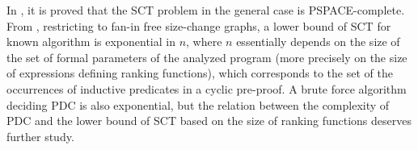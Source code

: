 In \cite{Lee1}, it is proved that the SCT problem in the general case is PSPACE-complete. 
From  \cite{Lee3}, restricting to fan-in free size-change graphs, a lower bound of SCT
for known algorithm is exponential in $n$, where $n$ essentially depends on the size of the set of formal parameters of the analyzed program (more precisely on the size of expressions defining ranking functions), which corresponds to the set of the occurrences of inductive predicates in a cyclic pre-proof. A brute force algorithm deciding PDC is also exponential, but the relation between the complexity of PDC and the lower bound of SCT based on the size of ranking functions %
deserves further study.
